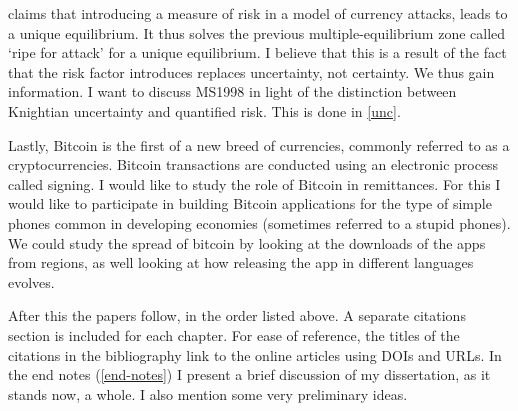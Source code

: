\documentclass[a4paper]{report}
\begin{document}
\begin{refsection}

\textcite{morris1998unique} claims that introducing a measure of risk in a model of currency attacks, leads to a unique equilibrium.
It thus solves the previous multiple-equilibrium zone called `ripe for attack' for a unique equilibrium.
I believe that this is a result of the fact that the risk factor introduces replaces uncertainty, not certainty.
We thus gain information.
I want to discuss MS1998 in light of the distinction between Knightian uncertainty and quantified risk.
This is done in \autoref{unc}.

Lastly, Bitcoin is the first of a new breed of currencies, commonly referred to as a cryptocurrencies. 
Bitcoin transactions are conducted using an electronic process called signing.
I would like to study the role of Bitcoin in remittances.
For this I would like to participate in building Bitcoin applications for the type of simple phones common in developing economies (sometimes referred to a stupid phones).
We could study the spread of bitcoin by looking at the downloads of the apps from regions,
as well looking at how releasing the app in different languages evolves.

After this the papers follow, in the order listed above.
A separate citations section is included for each chapter.
For ease of reference, the titles of the citations in the bibliography link to the online articles using DOIs and URLs.
In the end notes (\autoref{end-notes}) I present a brief discussion of my dissertation, as it stands now, a whole.
I also mention some very preliminary ideas.

\printbibliography
\end{refsection}
\end{document}
